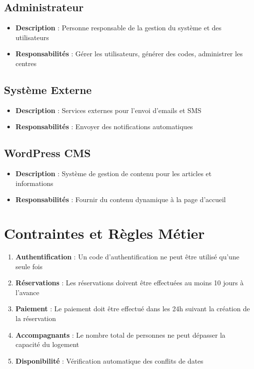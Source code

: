 \documentclass[12pt,a4paper]{article}
\begin{document}
\subsection{Administrateur}
\begin{itemize}
    \item \textbf{Description} : Personne responsable de la gestion du système et des utilisateurs
    \item \textbf{Responsabilités} : Gérer les utilisateurs, générer des codes, administrer les centres
\end{itemize}

\subsection{Système Externe}
\begin{itemize}
    \item \textbf{Description} : Services externes pour l'envoi d'emails et SMS
    \item \textbf{Responsabilités} : Envoyer des notifications automatiques
\end{itemize}

\subsection{WordPress CMS}
\begin{itemize}
    \item \textbf{Description} : Système de gestion de contenu pour les articles et informations
    \item \textbf{Responsabilités} : Fournir du contenu dynamique à la page d'accueil
\end{itemize}

\section{Contraintes et Règles Métier}

\begin{enumerate}
    \item \textbf{Authentification} : Un code d'authentification ne peut être utilisé qu'une seule fois
    \item \textbf{Réservations} : Les réservations doivent être effectuées au moins 10 jours à l'avance
    \item \textbf{Paiement} : Le paiement doit être effectué dans les 24h suivant la création de la réservation
    \item \textbf{Accompagnants} : Le nombre total de personnes ne peut dépasser la capacité du logement
    \item \textbf{Disponibilité} : Vérification automatique des conflits de dates
\end{enumerate}
\end{document}

